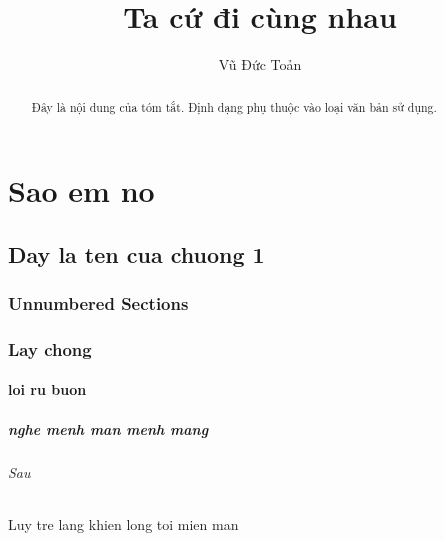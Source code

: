 \documentclass[12pt,a4paper]{article}
\title{Ta cứ đi cùng nhau}
\author{Vũ Đức Toản}
\begin{document}
\maketitle
\tableofcontents
	\part[onecolumn]{Sao em no} 
	\chapter{Day la ten cua chuong 1} 
	\section*{Unnumbered	Sections} 
	\section{Lay chong}
	\subsection{loi ru buon}
	\subsubsection{nghe menh man menh mang}
	\paragraph{Sau}
	\subparagraph{Luy tre lang khien long toi mien man}
	
	
		
	
	
	
	\begin{abstract}
		Đây là nội dung của
		tóm tắt. Định dạng
		phụ thuộc vào loại
		văn bản sử dụng.
	\end{abstract}
\end{document}
